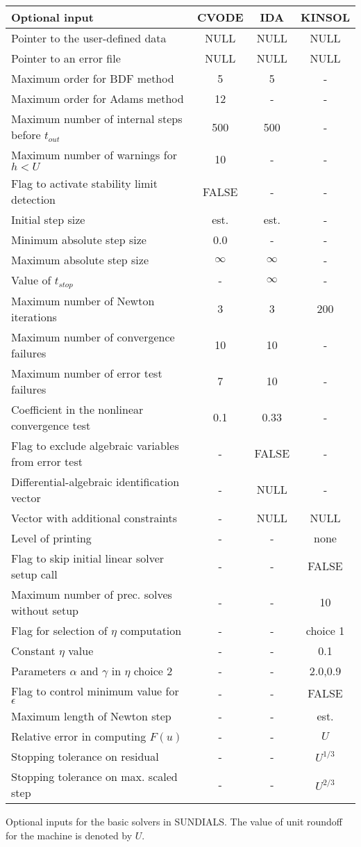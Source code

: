 \begin{acmtable}{340pt}
\centering
\begin{tabular}{p{2.75in} c c c }
Optional input & CVODE  & IDA & KINSOL \\
\hline
Pointer to the user-defined data & NULL & NULL& NULL \\
Pointer to an error file & NULL & NULL & NULL \\
Maximum order for BDF method & 5 & 5 & - \\
Maximum order for Adams method& 12  & - & - \\
Maximum number of internal steps before $t_{out}$ & 500 & 500 & - \\
Maximum number of warnings for $h < U$ & 10 & - & - \\
Flag to activate stability limit detection & FALSE & - & - \\
Initial step size & est. & est. & - \\
Minimum absolute step size & 0.0 & - & - \\
Maximum absolute step size & $\infty$ & $\infty$ & - \\
Value of $t_{stop}$ & - & $\infty$ & - \\
Maximum number of Newton iterations & 3 & 3 & 200 \\
Maximum number of convergence failures & 10 & 10 & - \\
Maximum number of error test failures & 7 & 10 & - \\
Coefficient in the nonlinear convergence test & 0.1 & 0.33 & - \\
Flag to exclude algebraic variables from error test & - & FALSE & - \\
Differential-algebraic identification vector & - & NULL & - \\
Vector with additional constraints & - & NULL & NULL \\
Level of printing & - & - & none \\
Flag to skip initial linear solver setup call & - & - & FALSE \\
Maximum number of prec. solves without setup & - & - & 10 \\
Flag for selection of $\eta$ computation & - & - & choice 1 \\
Constant $\eta$ value & - & - & 0.1 \\
Parameters $\alpha$ and $\gamma$ in $\eta$ choice 2 & - & - & $2.0$,$0.9$\\
Flag to control minimum value for $\epsilon$ & - & - & FALSE \\
Maximum length of Newton step & - & - & est. \\
Relative error in computing $F(u)$ & - & - & $U$ \\
Stopping tolerance on residual & - & - & $U^{1/3}$ \\
Stopping tolerance on max. scaled step & - & - & $U^{2/3}$ \\
\end{tabular}
\caption{Optional inputs for the basic solvers in SUNDIALS. 
The value of unit roundoff for the machine is denoted by $U$.}
\label{t:optional_input}
\end{acmtable}

